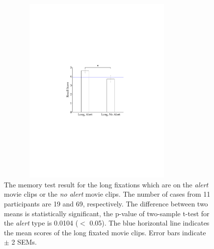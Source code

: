 \documentclass[oneside,master]{snueethesis}
\begin{document}
\begin{figure}
  \centerline{\includegraphics[width=100mm,height=94mm,trim=54mm 90mm 54mm 90mm]{./eps/memtest_long.pdf}}
  \caption[The memory test result for the long fixations which are on alert movie clips or no alert movie clips]{The memory test result for the long fixations which are on the \textit{alert} movie clips or the \textit{no alert} movie clips. The number of cases from 11 participants are 19 and 69, respectively. The difference between two means is statistically significant, the p-value of two-sample t-test for the \textit{alert} type is 0.0104 ($<$ 0.05). The blue horizontal line indicates the mean scores of the long fixated movie clips. Error bars indicate $\pm$ 2 SEMs.}
  \label{fig:memtest-long}
\end{figure}
\end{document}
